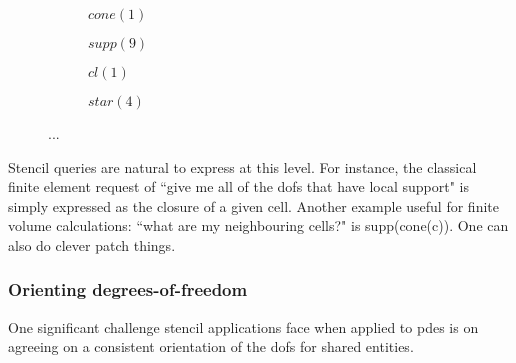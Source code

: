\begin{figure}
  \centering
  \begin{subfigure}{0.45\textwidth}
    \centering
    \caption{$cone(1)$}
  \end{subfigure}
  \begin{subfigure}{0.45\textwidth}
    \centering
    \caption{$supp(9)$}
  \end{subfigure}
  \begin{subfigure}{0.45\textwidth}
    \centering
    \caption{$cl(1)$}
  \end{subfigure}
  \begin{subfigure}{0.45\textwidth}
    \centering
    \caption{$star(4)$}
  \end{subfigure}

  \caption{...}
  \label{fig:plex_restrictions}
\end{figure}


Stencil queries are natural to express at this level.
For instance, the classical finite element request of ``give me all of the \glspl{dof} that have local support" is simply expressed as the closure of a given cell.
Another example useful for finite volume calculations: ``what are my neighbouring cells?" is supp(cone(c)).
One can also do clever patch things.


\subsubsection{Orienting degrees-of-freedom}

One significant challenge stencil applications face when applied to \glspl{pde} is on agreeing on a consistent orientation of the \glspl{dof} for shared entities.

